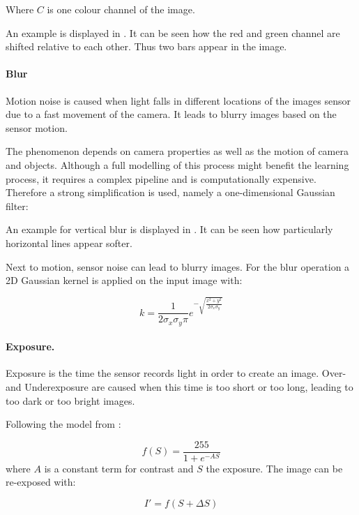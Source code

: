 Where $C$ is one colour channel of the image.

An example is displayed in . It can be seen how the red and green channel are shifted relative to each other. Thus two bars appear in the image.

\paragraph{Blur}

Motion noise is caused when light falls in different locations of the images sensor due to a fast movement of the camera. It leads to blurry images based on the sensor motion.

The phenomenon depends on camera properties as well as the motion of camera and objects. Although a full modelling of this process might benefit the learning process, it requires a complex pipeline and is computationally expensive. Therefore a strong simplification is used, namely a one-dimensional Gaussian filter:

An example for vertical blur is displayed in . It can be seen how particularly horizontal lines appear softer.

Next to motion, sensor noise can lead to blurry images. For the blur operation a 2D Gaussian kernel is applied on the input image with:

\begin{equation}
k = \frac{1}{2\sigma_x\sigma_y\pi}e^{-\sqrt{\frac{x^2 + y^2}{2\sigma_x\sigma_y}}} 
\end{equation}
\paragraph{Exposure.}

Exposure is the time the sensor records light in order to create an image. Over- and Underexposure are caused when this time is too short or too long, leading to too dark or too bright images.

Following the model from \cite{Carlson2018}:

\begin{equation}
f(S) = \frac{255}{1 + e^{-A S}}
\end{equation}
where $A$ is a constant term for contrast and $S$ the exposure.
The image can be re-exposed with:

\begin{equation}
I' = f(S+\Delta S)
\end{equation}

